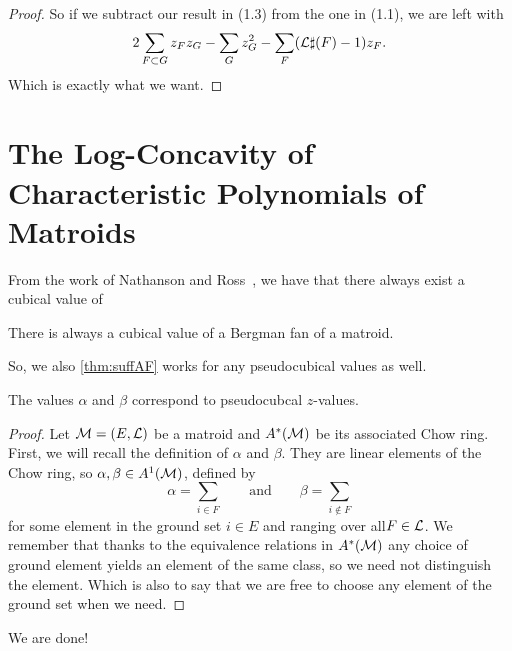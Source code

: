 \documentclass[12pt,oneside]{../../sfsuthesis}
\begin{document}
\begin{proof}
    So if we subtract our result in (1.3) from the one in (1.1), we are left with
    \[
        2\sum_{F \subset G} z_F z_G - \sum_G z^2_G - \sum_F (\mathcal{L}\sharp(F) - 1)z_F.
    \]
    Which is exactly what we want.




\end{proof}

\section{The Log-Concavity of Characteristic Polynomials of Matroids}

\begin{Result}
\end{Result}

From the work of Nathanson and Ross~\cite{nathansonTropicalFansNormal2021}, we have that there always exist a cubical value of
\begin{lemma}
    There is always a cubical value of a Bergman fan of a matroid.
\end{lemma}
So, we also \th\ref{thm:suffAF} works for any pseudocubical values as well.

\begin{lemma}
    The values \( \alpha \) and \( \beta \) correspond to pseudocubcal \( z \)-values.
\end{lemma}
\begin{proof}
    Let \( \mathcal{M} = (E, \mathcal{L}) \) be a matroid and \( A^*(\mathcal{M}) \) be its associated Chow ring.
    First, we will recall the definition of \( \alpha \) and \( \beta \).
    They are linear elements of the Chow ring, so \( \alpha, \beta \in A^1(\mathcal{M}) \), defined by
    \[
        \alpha = \sum_{i \in F} \quad \quad \text{and} \quad \quad \beta = \sum_{i \notin F}
    \]
    for some element in the ground set \( i \in E \) and ranging over all\( F \in \mathcal{L} \).
    We remember that thanks to the equivalence relations in \( A^\ast(\mathcal{M}) \) any choice of ground element yields an element of the same class, so we need not distinguish the element.
    Which is also to say that we are free to choose any element of the ground set when we need.

\end{proof}

We are done!
\end{document}
